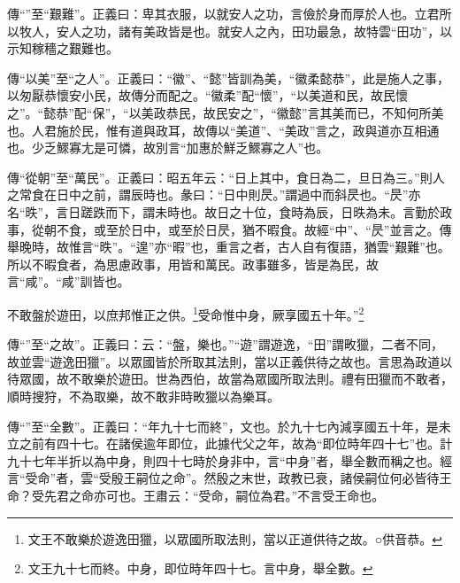 {\noindent\zhuan{}\fzbyks 傳“”至“艱難”。正義曰：卑其衣服，以就安人之功，言儉於身而厚於人也。立君所以牧人，安人之功，諸有美政皆是也。就安人之內，田功最急，故特雲“田功”，以示知稼穡之艱難也。 \par}

{\noindent\zhuan{}\fzbyks 傳“以美”至“之人”。正義曰：“徽”、“懿”皆訓為美，“徽柔懿恭”，此是施人之事，以匆厭恭懷安小民，故傳分而配之。“徽柔”配“懷”，“以美道和民，故民懷之”。“懿恭”配“保”，“以美政恭民，故民安之”，“徽懿”言其美而已，不知何所美也。人君施於民，惟有道與政耳，故傳以“美道”、“美政”言之，政與道亦互相通也。少乏鰥寡尢是可憐，故別言“加惠於鮮乏鰥寡之人”也。 \par}

{\noindent\zhuan{}\fzbyks 傳“從朝”至“萬民”。正義曰：昭五年云：“日上其中，食日為二，旦日為三。”則人之常食在日中之前，謂辰時也。彖曰：“日中則昃。”謂過中而斜昃也。“昃”亦名“昳”，言日蹉跌而下，謂未時也。故日之十位，食時為辰，日昳為未。言勤於政事，從朝不食，或至於日中，或至於日昃，猶不暇食。故經“中”、“昃”並言之。傳舉晚時，故惟言“昳”。“遑”亦“暇”也，重言之者，古人自有復語，猶雲“艱難”也。所以不暇食者，為思慮政事，用皆和萬民。政事雖多，皆是為民，故言“咸”。“咸”訓皆也。 \par}

不敢盤於遊田，以庶邦惟正之供。\footnote{文王不敢樂於遊逸田獵，以眾國所取法則，當以正道供待之故。○供音恭。}受命惟中身，厥享國五十年。”\footnote{文王九十七而終。中身，即位時年四十七。言中身，舉全數。}

{\noindent\zhuan{}\fzbyks 傳“”至“之故”。正義曰：云：“盤，樂也。”“遊”謂遊逸，“田”謂畋獵，二者不同，故並雲“遊逸田獵”。以眾國皆於所取其法則，當以正義供待之故也。言思為政道以待眾國，故不敢樂於遊田。世為西伯，故當為眾國所取法則。禮有田獵而不敢者，順時搜狩，不為取樂，故不敢非時畋獵以為樂耳。 \par}

{\noindent\zhuan{}\fzbyks 傳“”至“全數”。正義曰：“年九十七而終”，文也。於九十七內減享國五十年，是未立之前有四十七。在諸侯逾年即位，此據代父之年，故為“即位時年四十七”也。計九十七年半折以為中身，則四十七時於身非中，言“中身”者，舉全數而稱之也。經言“受命”者，雲“受殷王嗣位之命”。然殷之末世，政教已衰，諸侯嗣位何必皆待王命？受先君之命亦可也。王肅云：“受命，嗣位為君。”不言受王命也。 \par}

